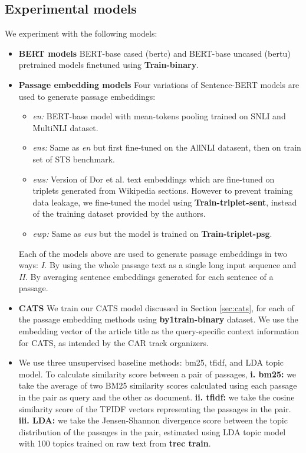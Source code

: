 \subsection{Experimental models} We experiment with the following models:
\begin{itemize}[leftmargin=.15in]
    \item \textbf{BERT models} BERT-base cased (bertc) and BERT-base uncased (bertu) pretrained models finetuned using \textbf{Train-binary}.
    \item \textbf{Passage embedding models} Four variations of Sentence-BERT models are used to generate passage embeddings: 
    \begin{itemize}[leftmargin=.2in]
        \item \textit{en:} BERT-base model with mean-tokens pooling trained on SNLI and MultiNLI dataset.
        \item \textit{ens:} Same as \textit{en} but first fine-tuned on the AllNLI datasent, then on train set of STS benchmark.
        \item \textit{ews:} Version of Dor et al. text embeddings which are fine-tuned on triplets generated from Wikipedia sections. However to prevent training data leakage, we fine-tuned the model using \textbf{Train-triplet-sent}, instead of the training dataset provided by the authors.
        \item \textit{ewp:} Same as \textit{ews} but the model is trained on \textbf{Train-triplet-psg}.
    \end{itemize}
    Each of the models above are used to generate passage embeddings in two ways: \textit{I. } By using the whole passage text as a single long input sequence and \textit{II. } By averaging sentence embeddings generated for each sentence of a passage. 
    \item \textbf{CATS} We train our CATS model discussed in Section \ref{sec:cats}, for each of the passage embedding methods using \textbf{by1train-binary} dataset. We use the embedding vector of the article title as the query-specific context information for CATS, as intended by the CAR track organizers.
    \item We use three unsupervised baseline methods: bm25, tfidf, and LDA topic model. To calculate similarity score between a pair of passages, \textbf{i. bm25:} we take the average of two BM25 similarity scores calculated using each passage in the pair as query and the other as document. \textbf{ii. tfidf:} we take the cosine similarity score of the TFIDF vectors representing the passages in the pair. \textbf{iii. LDA:} we take the Jensen-Shannon divergence score between the topic distribution of the passages in the pair, estimated using LDA topic model with 100 topics trained on raw text from \textbf{trec train}.
\end{itemize}

